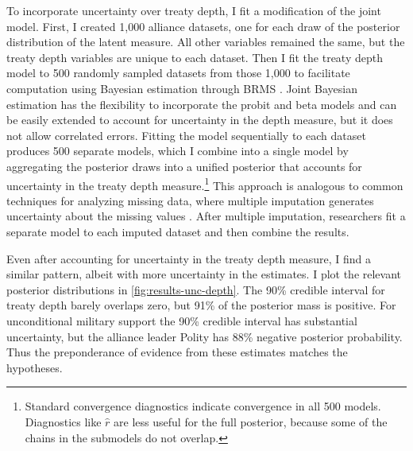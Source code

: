 \documentclass[12pt]{article}
\begin{document}
To incorporate uncertainty over treaty depth, I fit a modification of the joint model. 
First, I created 1,000 alliance datasets, one for each draw of the posterior distribution of the latent measure.
All other variables remained the same, but the treaty depth variables are unique to each dataset. 
Then I fit the treaty depth model to 500 randomly sampled datasets from those 1,000 to facilitate computation using Bayesian estimation through BRMS \citep{Buerkner2017}. 
Joint Bayesian estimation has the flexibility to incorporate the probit and beta models and can be easily extended to account for uncertainty in the depth measure, but it does not allow correlated errors. 
Fitting the model sequentially to each dataset produces 500 separate models, which I combine into a single model by aggregating the posterior draws into a unified posterior that accounts for uncertainty in the treaty depth measure.\footnote{Standard convergence diagnostics indicate convergence in all 500 models. Diagnostics like $\hat{r}$ are less useful for the full posterior, because some of the chains in the submodels do not overlap.}
This approach is analogous to common techniques for analyzing missing data, where multiple imputation generates uncertainty about the missing values \citep{Hollenbachetal2018imp}.
After multiple imputation, researchers fit a separate model to each imputed dataset and then combine the results. 


Even after accounting for uncertainty in the treaty depth measure, I find a similar pattern, albeit with more uncertainty in the estimates. 
I plot the relevant posterior distributions in \autoref{fig:results-unc-depth}. 
The 90\% credible interval for treaty depth barely overlaps zero, but 91\% of the posterior mass is positive. 
For unconditional military support the 90\% credible interval has substantial uncertainty, but the alliance leader Polity has 88\% negative posterior probability. 
Thus the preponderance of evidence from these estimates matches the hypotheses. 
\end{document}
